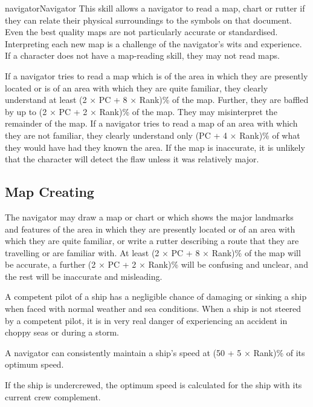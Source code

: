 \begin{Skill}[1.1]{navigator}{Navigator}
This skill allows a navigator to read a map, chart or rutter if they
can relate their physical surroundings to the symbols on that
document.  Even the best quality maps are not particularly accurate or
standardised. Interpreting each new map is a challenge of the
navigator’s wits and experience. If a character does not have a
map-reading skill, they may not read maps.

If a navigator tries to read a map which is of the area in which they
are presently located or is of an area with which they are quite
familiar, they clearly understand at least (2 × PC + 8 × Rank)\% of
the map.  Further, they are baffled by up to (2 × PC + 2 × Rank)\% of
the map. They may misinterpret the remainder of the map.  If a
navigator tries to read a map of an area with which they are not
familiar, they clearly understand only (PC + 4 × Rank)\% of what they
would have had they known the area.  If the map is inaccurate, it is
unlikely that the character will detect the flaw unless it was
relatively major.


\subsection{Map Creating}

The navigator may draw a map or chart or which shows the major
landmarks and features of the area in which they are presently located
or of an area with which they are quite familiar, or write a rutter
describing a route that they are travelling or are familiar with. At
least (2 × PC + 8 × Rank)\% of the map will be accurate, a further (2
× PC + 2 × Rank)\% will be confusing and unclear, and the rest will be
inaccurate and misleading.


A competent pilot of a ship has a negligible chance of damaging or
sinking a ship when faced with normal weather and sea conditions.
When a ship is not steered by a competent pilot, it is in very real
danger of experiencing an accident in choppy seas or during a storm.

A navigator can consistently maintain a ship’s speed at (50 + 5 ×
Rank)\% of its optimum speed.

If the ship is undercrewed, the optimum speed is calculated for the
ship with its current crew complement.


\end{Skill}
